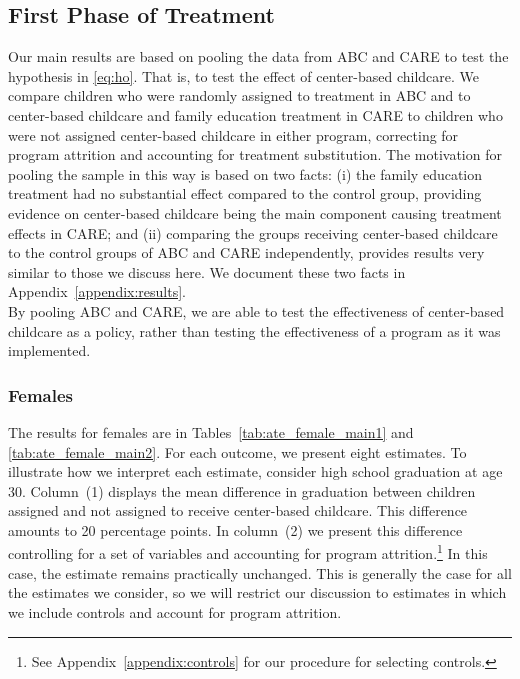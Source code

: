 \subsection{First Phase of Treatment} \label{section:center}

\noindent Our main results are based on pooling the data from ABC and CARE to test the hypothesis in \eqref{eq:ho}. That is, to test the effect of center-based childcare. We compare children who were randomly assigned to treatment in ABC and to center-based childcare and family education treatment in CARE to children who were not assigned center-based childcare in either program, correcting for program attrition and accounting for treatment substitution. The motivation for pooling the sample in this way is based on two facts: (i) the family education treatment had no substantial effect compared to the control group, providing evidence on center-based childcare being the main component causing treatment effects in CARE; and (ii) comparing the groups receiving center-based childcare to the control groups of ABC and CARE independently, provides results very similar to those we discuss here. We document these two facts in Appendix~\ref{appendix:results}.\\

\noindent By pooling ABC and CARE, we are able to test the effectiveness of center-based childcare as a policy, rather than testing the effectiveness of a program as it was implemented.\\

\subsubsection{Females} \label{section:centerfemales}

\noindent The results for females are in Tables~\ref{tab:ate_female_main1} and \ref{tab:ate_female_main2}. For each outcome, we present eight estimates. To illustrate how we interpret each estimate, consider high school graduation at age 30. Column~(1) displays the mean difference in graduation between children assigned and not assigned to receive center-based childcare. This difference amounts to 20 percentage points. In column~(2) we present this difference controlling for a set of variables and accounting for program attrition.\footnote{See Appendix~\ref{appendix:controls} for our procedure for selecting controls.} In this case, the estimate remains practically unchanged. This is generally the case for all the estimates we consider, so we will restrict our discussion to estimates in which we include controls and account for program attrition.\\

